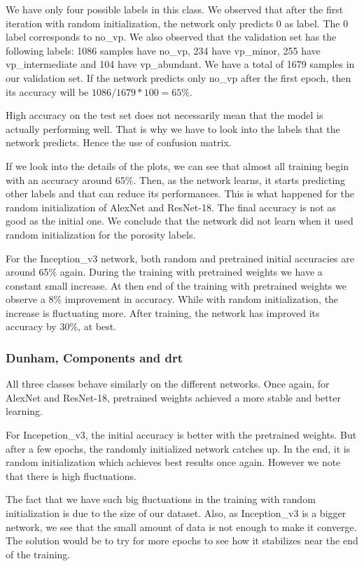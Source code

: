 We have only four possible labels in this class. We observed that after the first iteration with random initialization, the network only predicts 0 as label. The 0 label corresponds to no\_vp.
We also observed that the validation set has the following labels: 1086 samples have no\_vp, 234 have vp\_minor, 255 have vp\_intermediate and 104 have vp\_abundant. We have a total of 1679 samples in our validation set. If the network predicts only no\_vp after the first epoch, then its accuracy will be \(1086/1679 * 100 = 65\%\). 

High accuracy on the test set does not necessarily mean that the model is actually performing well. That is why we have to look into the labels that the network predicts. Hence the use of confusion matrix. 

If we look into the details of the plots, we can see that almost all training begin with an accuracy around 65\%. Then, as the network learns, it starts predicting other labels and that can reduce its performances. This is what happened for the random initialization of AlexNet and ResNet-18. The final accuracy is not as good as the initial one. We conclude that the network did not learn when it used random initialization for the porosity labels.

For the Inception\_v3 network, both random and pretrained initial accuracies are around 65\% again. During the training with pretrained weights we have a constant small increase. At then end of the training with pretrained weights we observe a 8\% improvement in accuracy. While with random initialization, the increase is fluctuating more. After training, the network has improved its accuracy by 30\%, at best.

\subsubsection{Dunham, Components and \gls{drt}}
All three classes behave similarly on the different networks. Once again, for AlexNet and ResNet-18, pretrained weights achieved a more stable and better learning. 

For Incepetion\_v3, the initial accuracy is better with the pretrained weights. But after a few epochs, the randomly initialized network catches up. In the end, it is random initialization which achieves best results once again. However we note that there is high fluctuations. 

The fact that we have such big fluctuations in the training with random initialization is due to the size of our dataset. Also, as Inception\_v3 is a bigger network, we see  that the small amount of data is not enough to make it converge. The solution would be to try for more epochs to see how it stabilizes near the end of the training. 

